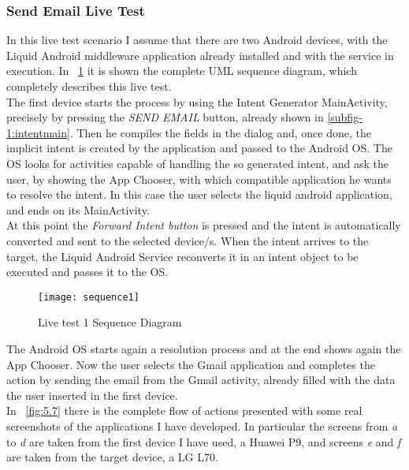 \subsubsection{Send Email Live Test}
In this live test scenario I assume that there are two Android devices, with the Liquid Android middleware application already installed and with the service in execution.
In \figurename~\ref{fig:5.6} it is shown the complete UML sequence diagram, which completely describes this live test.\\
The first device starts the process by using the Intent Generator MainActivity, precisely by pressing the \textit{SEND EMAIL} button, already shown in \ref{subfig-1:intentmain}. Then he compiles the fields in the dialog and, once done, the implicit intent is created by the application and passed to the Android OS. The OS looks for activities capable of handling the so generated intent, and ask the user, by showing the App Chooser, with which compatible application he wants to resolve the intent. In this case the user selects the liquid android application, and ends on its MainActivity.\\
At this point the \textit{Forward Intent button} is pressed and the intent is automatically converted and sent to the selected device/s. When the intent arrives to the target, the Liquid Android Service reconverts it in an intent object to be executed and passes it to the OS.
\begin{figure}[h]
	\centering
	\texttt{[image: sequence1]}
	\caption{Live test 1 Sequence Diagram}
	\label{fig:5.6}
\end{figure}
The Android OS starts again a resolution process and at the end shows again the App Chooser. Now the user selects the Gmail application and completes the action by sending the email from the Gmail activity, already filled with the data the user inserted in the first device.\\
In \figurename~\ref{fig:5.7} there is the complete flow of actions presented with some real screenshots of the applications I have developed. In particular the screens from \textit{a} to \textit{d} are taken from the first device I have used, a Huawei P9, and screens \textit{e} and \textit{f} are taken from the target device, a LG L70.
\\\\
